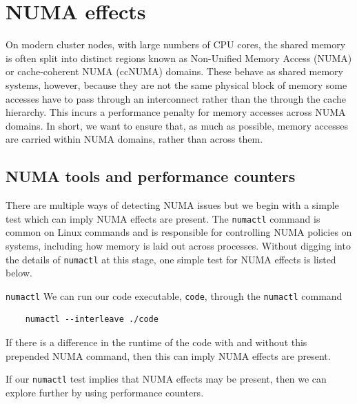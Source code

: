 \section{NUMA effects}
\label{section:node-level:numa}



On modern cluster nodes, with large numbers of CPU cores, the shared memory is
often split into distinct regions known as Non-Unified Memory Access (NUMA) or
cache-coherent NUMA (ccNUMA) domains. These behave as shared memory systems,
however, because they are not the same physical block of memory some accesses
have to pass through an interconnect rather than the through the cache
hierarchy. This incurs a performance penalty for memory accesses across NUMA
domains. In short, we want to ensure that, as much as possible, memory accesses
are carried within NUMA domains, rather than across them.

\subsection{NUMA tools and performance counters}

There are multiple ways of detecting NUMA issues but we begin with a simple
test which can imply NUMA effects are present. The \texttt{numactl} command is
common on Linux commands and is responsible for controlling NUMA policies on
systems, including how memory is laid out across processes. Without digging
into the details of \texttt{numactl} at this stage, one simple test for NUMA
effects is listed below.

\begin{instructions}{\texttt{numactl}}
  We can run our code executable, \texttt{code}, through the \texttt{numactl} command 
  \begin{verbatim}
    numactl --interleave ./code
  \end{verbatim}
  If there is a difference in the runtime of the code with and without this prepended NUMA command, then this can imply NUMA effects are present.
\end{instructions}

If our \texttt{numactl} test implies that NUMA effects may be present, then we
can explore further by using performance counters. 

